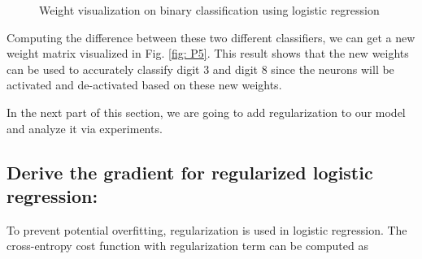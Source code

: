 \documentclass{article} %
\begin{document}
\begin{figure}%
	\centering
	\qquad
	\qquad
	\caption{Weight visualization on binary classification using logistic regression}%
	\label{fig:P4}%
\end{figure}

Computing the difference between these two different classifiers, we can get a new weight matrix visualized in Fig. \ref{fig: P5}. This result shows that the new weights can be used to accurately classify digit 3 and digit 8 since the neurons will be activated and de-activated based on these new weights.


In the next part of this section, we are going to add regularization to our model and analyze it via experiments.

\subsection{Derive the gradient for regularized logistic regression:}

To prevent potential overfitting, regularization is used in logistic regression. The cross-entropy cost function with regularization term can be computed as
\end{document}
